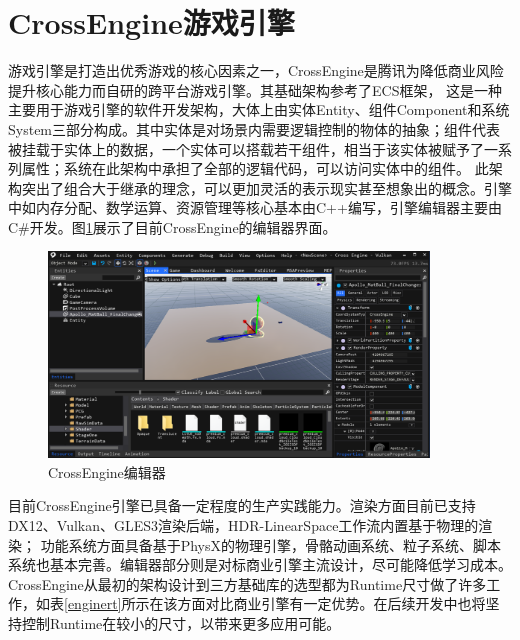 \section{CrossEngine游戏引擎}
游戏引擎是打造出优秀游戏的核心因素之一，CrossEngine是腾讯为降低商业风险提升核心能力而自研的跨平台游戏引擎。其基础架构参考了ECS框架，
这是一种主要用于游戏引擎的软件开发架构，大体上由实体Entity、组件Component和系统System三部分构成\cite{ce1}。其中实体是对场景内需要逻辑控制的物体的抽象；组件代表被挂载于实体上的数据，一个实体可以搭载若干组件，相当于该实体被赋予了一系列属性；系统在此架构中承担了全部的逻辑代码，可以访问实体中的组件。
此架构突出了组合大于继承的理念，可以更加灵活的表示现实甚至想象出的概念。引擎中如内存分配、数学运算、资源管理等核心基本由C++编写，引擎编辑器主要由C\#开发。图\ref{ceeditor}展示了目前CrossEngine的编辑器界面。
\begin{figure}[h!]
    \begin{center}
        \includegraphics[width=0.9\textwidth]{pictures/crossengine.png}
        \caption{CrossEngine编辑器}
        \label{ceeditor}
    \end{center}
\end{figure}
\par
目前CrossEngine引擎已具备一定程度的生产实践能力。渲染方面目前已支持DX12、Vulkan、GLES3渲染后端，HDR-LinearSpace工作流内置基于物理的渲染；
功能系统方面具备基于PhysX的物理引擎，骨骼动画系统、粒子系统、脚本系统也基本完善。编辑器部分则是对标商业引擎主流设计，尽可能降低学习成本。
CrossEngine从最初的架构设计到三方基础库的选型都为Runtime尺寸做了许多工作，如表\ref{enginert}所示在该方面对比商业引擎有一定优势。在后续开发中也将坚持控制Runtime在较小的尺寸，以带来更多应用可能。
